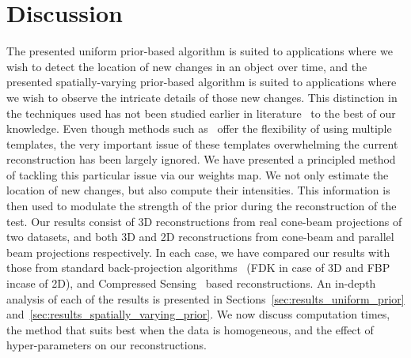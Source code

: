 \documentclass[journal]{IEEEtran}
\begin{document}


\section{Discussion}
\label{sec:discussion}
The presented uniform prior-based algorithm is suited to applications
where we wish to detect the location of new changes in an object over
time, and the presented spatially-varying prior-based algorithm is
suited to applications where we wish to observe the intricate details
of those new changes. This distinction in the techniques used has not
been studied earlier in
literature~\cite{geyer2015,PICCS,Ali2018,Tan2017} to the best of our
knowledge. Even though methods such as~\cite{Hakka2019} offer the flexibility of using multiple templates, the very important issue of these templates overwhelming the current reconstruction has been largely ignored. We have presented a principled method of tackling this particular issue via our weights map. We not only estimate the location of new changes, but also compute their intensities. This information is then used to modulate the strength of the prior during the reconstruction of the test. Our results consist of 3D reconstructions from real cone-beam projections of two datasets, and both 3D and 2D reconstructions from cone-beam and parallel beam projections respectively. In each case, we have compared our results with those from standard back-projection algorithms~\cite{Pan2009} (FDK in case of 3D and FBP incase of 2D), and Compressed Sensing~\cite{Donoho,introCS} based reconstructions. An in-depth analysis of each of the results is presented in Sections~\ref{sec:results_uniform_prior} and~\ref{sec:results_spatially_varying_prior}. We now discuss computation times, the method that suits best when the data is homogeneous, and the effect of hyper-parameters on our reconstructions.
\end{document}
